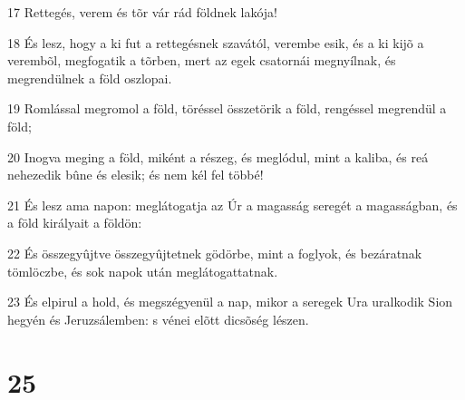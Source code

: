 \par 17 Rettegés, verem és tõr vár rád földnek lakója!
\par 18 És lesz, hogy a ki fut a rettegésnek szavától, verembe esik, és a ki kijõ a verembõl, megfogatik a tõrben, mert az egek csatornái megnyílnak, és megrendülnek a föld oszlopai.
\par 19 Romlással megromol a föld, töréssel összetörik a föld, rengéssel megrendül a föld;
\par 20 Inogva meging a föld, miként a részeg, és meglódul, mint a kaliba, és reá nehezedik bûne és elesik; és nem kél fel többé!
\par 21 És lesz ama napon: meglátogatja az Úr a magasság seregét a magasságban, és a föld királyait a földön:
\par 22 És összegyûjtve összegyûjtetnek gödörbe, mint a foglyok, és bezáratnak tömlöczbe, és sok napok után meglátogattatnak.
\par 23 És elpirul a hold, és megszégyenül a nap, mikor a seregek Ura uralkodik Sion hegyén és Jeruzsálemben: s vénei elõtt dicsõség lészen.

\chapter{25}

